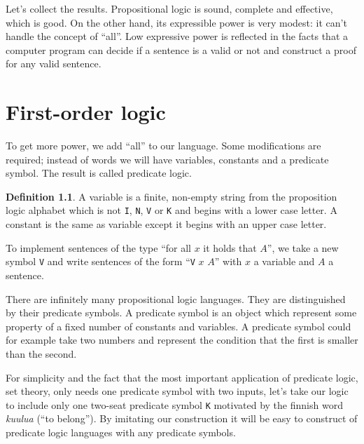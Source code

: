 \documentclass[11pt,oneside,%
]{memoir}
\theoremstyle{definition}
\newtheorem{maaritelma}{Definition}
\newcommand{\joukk}{\lstinline[language=joukko]}
\begin{document}
Let's collect the results. Propositional logic is sound, complete and effective, which is good. On the other hand, its expressible power is very modest: it can't handle the concept of ``all''. Low expressive power is reflected in the facts that a computer program can decide if a sentence is a valid or not and construct a proof for any valid sentence.

\chapter{First-order logic}

To get more power, we add ``all'' to our language. Some modifications are required; instead of words we will have variables, constants and a predicate symbol. The result is called predicate logic.

\begin{maaritelma}
A variable is a finite, non-empty string from the proposition logic alphabet which is not \joukk!I!, \joukk!N!, \joukk!V! or \joukk!K! and begins with a lower case letter. A constant is the same as variable except it begins with an upper case letter.
\end{maaritelma}

To implement sentences of the type ``for all \(x\) it holds that \(A\)'', we take a new symbol \joukk!V! and write sentences of the form ``\joukk!V! \(x\) \(A\)'' with \(x\) a variable and \(A\) a sentence.

There are infinitely many propositional logic languages. They are distinguished by their predicate symbols. A predicate symbol is an object which represent some property of a fixed number of constants and variables. A predicate symbol could for example take two numbers and represent the condition that the first is smaller than the second.

For simplicity and the fact that the most important application of predicate logic, set theory, only needs one predicate symbol with two inputs, let's take our logic to include only one two-seat predicate symbol \joukk!K! motivated by the finnish word \emph{kuulua} (``to belong''). By imitating our construction it will be easy to construct of predicate logic languages with any predicate symbols.
\end{document}
